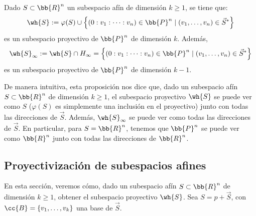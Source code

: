 \begin{prop}
    Dado $S\subset \bb{R}^n$ un subespacio afín de dimensión $k\geq 1$,
    se tiene que:
    \begin{equation*}
        \wh{S} := \varphi(S) \cup  \left\{(0:v_1:\dots:v_n)\in \bb{P}^n \mid (v_1,\dots,v_n)\in \vec{S}^\ast\right\}
    \end{equation*}
    es un subespacio proyectivo de $\bb{P}^n$ de dimensión $k$. Además,
    \begin{equation*}
        \wh{S}_\infty := \wh{S}\cap H_{\infty} = \left\{(0:v_1:\dots:v_n)\in \bb{P}^n \mid (v_1,\dots,v_n)\in \vec{S}^\ast\right\}
    \end{equation*}
    es un subespacio proyectivo de $\bb{P}^n$ de dimensión $k-1$.
\end{prop}

De manera intuitiva, esta proposición nos dice que, dado un subespacio afín $S\subset \bb{R}^n$ de dimensión $k\geq 1$,
el subespacio proyectivo $\wh{S}$ se puede ver como $S$ ($\varphi(S)$ es simplemente una inclusión en el proyectivo) junto con todas las direcciones de $\vec{S}$.
Además, $\wh{S}_\infty$ se puede ver como todas las direcciones de $\vec{S}$. En particular, para $S=\bb{R}^n$,
tenemos que $\bb{P}^n$ se puede ver como $\bb{R}^n$ junto con todas las direcciones de $\bb{R}^n$.

\subsection{Proyectivización de subespacios afines}

En esta sección, veremos cómo, dado un subespacio afín $S\subset \bb{R}^n$ de dimensión $k\geq 1$, obtener el subespacio proyectivo $\wh{S}$.
Sea $S=p+\vec{S}$, con $\cc{B}= \{v_1,\dots,v_k\}$ una base de $\vec{S}$.

